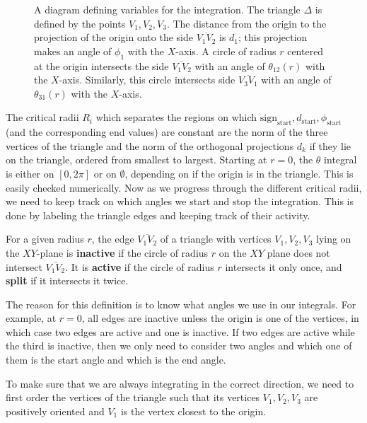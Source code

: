 \documentclass[../paper.tex]{subfiles}
\begin{document}
\begin{figure}
\begin{center}
\begin{tikzpicture}
\end{tikzpicture}
\end{center}
\caption{A diagram defining variables for the integration. The triangle $\Delta$ is defined by the points $V_1, V_2, V_3$. 
The distance from the origin to the projection of the origin onto the side $\overline{V_1V_2}$ is $d_{1}$; this projection makes an angle of $\phi_{1}$ with the $X$-axis. 
A circle of radius $r$ centered at the origin intersects the side $\overline{V_1V_2}$ with an angle of $\theta_{12}(r)$ with the $X$-axis. 
Similarly, this circle intersects side $\overline{V_3V_1}$ with an angle of $\theta_{31}(r)$ with the $X$-axis.\label{fig:variablediagram}}
\end{figure}

The critical radii $R_i$ which separates the regions on which $\mathrm{sign}_\mathrm{start}, d_\mathrm{start}, \phi_\mathrm{start}$ (and the corresponding end values) are constant are the norm of the three vertices of the triangle 
and the norm of the orthogonal projections $d_k$ if they lie on the triangle, ordered from smallest to largest. 
Starting at $r = 0$, the $\theta$ integral is either on $[0, 2\pi]$ or on $\emptyset$, depending on if the origin is in the triangle. 
This is easily checked numerically. Now as we progress through the different critical radii, we need to keep track on which angles we start and stop the integration. 
This is done by labeling the triangle edges and keeping track of their activity. 

\begin{definition}
    For a given radius $r$, the edge $\overline{V_1V_2}$ of a triangle with vertices $V_1, V_2, V_3$ lying on the $XY$-plane is \textbf{inactive} if the circle of radius $r$ on the $XY$ plane does not intersect $\overline{V_1V_2}$. 
    It is \textbf{active} if the circle of radius $r$ intersects it only once, and \textbf{split} if it intersects it twice. 
\end{definition}
The reason for this definition is to know what angles we use in our integrals. 
For example, at $r=0$, all edges are inactive unless the origin is one of the vertices, in which case two edges are active and one is inactive. 
If two edges are active while the third is inactive, then we only need to consider two angles and which one of them is the start angle and which is the end angle. 

To make sure that we are always integrating in the correct direction, we need to first order the vertices of the triangle such that its vertices $V_1, V_2, V_3$ are positively oriented and $V_1$ is the vertex closest to the origin. 
\end{document}
